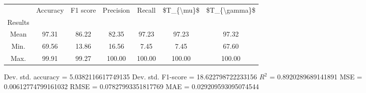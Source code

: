 \begin{tabular}{|c|c|c|c|c|c|c|}
\toprule
{} &  Accuracy &  F1 score &  Precision &  Recall &  \$T\_\{\textbackslash mu\}\$ &  \$T\_\{\textbackslash gamma\}\$ \\
Results &           &           &            &         &            &               \\
\hline
Mean    &     97.31 &     86.22 &      82.35 &   97.23 &      97.23 &         97.32 \\
Min.    &     69.56 &     13.86 &      16.56 &    7.45 &       7.45 &         67.60 \\
Max.    &     99.91 &     99.27 &     100.00 &  100.00 &     100.00 &        100.00 \\
\bottomrule
\end{tabular}

 Dev. std. accuracy = 5.0382116617749135
 Dev. std. F1-score = 18.622798722233156
 $R^2$ = 0.8920289689141891
 MSE = 0.00612774799161032
 RMSE = 0.07827993351817769
 MAE = 0.029209593095074544